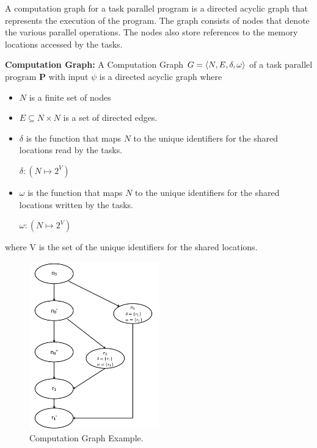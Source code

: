 A computation graph for a task parallel program is a directed acyclic graph that represents the execution of the program. The graph consists of nodes that denote the various parallel operations. The nodes also store references to the memory locations accessed by the tasks.

\begin{definition}
\textbf{Computation Graph:} A Computation Graph 
$G = \langle N, E, \delta, \omega \rangle $ of a task parallel program \textbf{P} with input $\psi$ is a directed acyclic graph where

\begin{itemize}
\item $N$ is a finite set of nodes
\item $E \subseteq N \times N$ is a set of directed edges. 
\item $\delta$ is the function that maps $N$ to the unique identifiers for the shared locations read by the tasks.
\begin{center}
$\delta : (N \mapsto 2^{V})$ 
\end{center}
\item $\omega$ is the function that maps $N$ to the unique identifiers for the shared locations written by the tasks.
\begin{center}
$\omega : (N \mapsto 2^{V})$ 
\end{center}
\end{itemize}
where V is the set of the unique identifiers for the shared locations.
\end{definition}

\begin{figure}
  \centering
        \includegraphics[width=0.5\textwidth]{../figs/Fig3-1.pdf}
    \caption{Computation Graph Example.}
    \label{fig:cg}
\end{figure}


